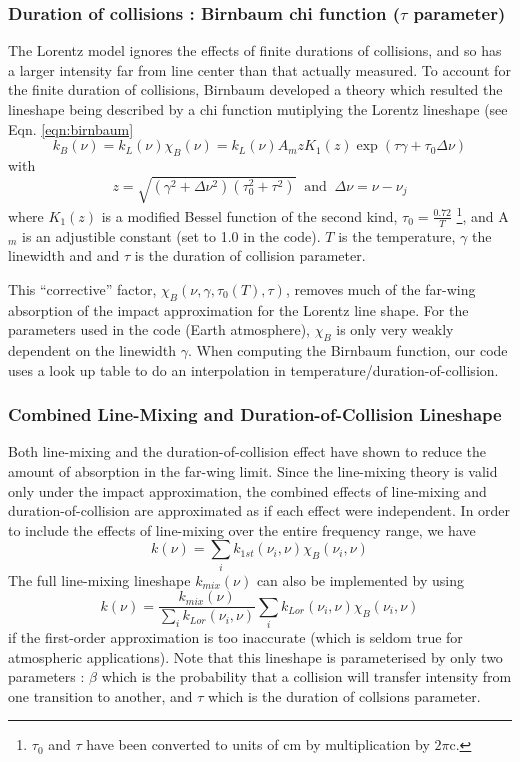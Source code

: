 \documentclass[11pt]{article}
\begin{document}
\subsubsection{Duration of collisions : Birnbaum chi function ($\tau$ 
parameter)}
The Lorentz model ignores the effects of finite durations of collisions, and
so has a larger intensity far from line center than that actually measured. 
To account for the finite duration of collisions, Birnbaum developed a 
theory which resulted the lineshape being described by a chi function 
mutiplying the Lorentz lineshape (see Eqn. \ref{eqn:birnbaum} 
\[
k_{B}(\nu)=k_{L}(\nu)\chi_{B}(\nu)=k_{L}(\nu) A_{m} z K_{1}(z)\exp\left(
\tau\gamma+\tau_{0}\Delta\nu\right)
\]
with
\[
z=\sqrt{(\gamma^{2}+\Delta\nu^{2})(\tau_{0}^{2}+\tau^{2})}
\; \; \mbox{and} \; \;
\Delta\nu=\nu-\nu_{j}
\]
where $K_{1}(z)$ is a modified Bessel function of the second kind, 
$\tau_{0}=\frac{0.72}{T}$ \footnote{$\tau_{0}$ and $\tau$ have been
converted to units of $\mbox{cm}$ by multiplication by $2\pi\mbox{c}$.}, 
and A$_{m}$ is an adjustible constant (set to 1.0 in the code).  $T$ is the 
temperature, $\gamma$ the linewidth and and $\tau$ is the duration of 
collision parameter.

This ``corrective'' factor, $\chi_{B}(\nu,\gamma,\tau_{0}(T),\tau)$, 
removes much of the far-wing absorption of the impact approximation for the 
Lorentz line shape. For the parameters used in the code (Earth atmosphere),
$\chi_{B}$ is only very weakly dependent on the linewidth $\gamma$.  
When computing the Birnbaum function, our code uses a look up table to do 
an interpolation in temperature/duration-of-collision.

\subsubsection{Combined Line-Mixing and Duration-of-Collision Lineshape}
Both line-mixing and the duration-of-collision effect have shown to reduce
the amount of absorption in the far-wing limit.  Since the line-mixing
theory is valid only under the impact approximation, the combined effects
of line-mixing and duration-of-collision are approximated as if each
effect were independent.  In order to include the effects of line-mixing
over the entire frequency range, we have 
\[
k(\nu)=\sum_i k_{1st}(\nu_i,\nu)\chi_{B}(\nu_i,\nu)
\]
The full line-mixing lineshape $k_{mix}(\nu)$ can also be implemented by 
using 
\[
k(\nu)=\frac{k_{mix}(\nu)}{\sum_i k_{Lor}(\nu_i,\nu)}
\sum_i k_{Lor}(\nu_i,\nu)\chi_B(\nu_i,\nu)
\]
if the first-order approximation is too inaccurate (which is seldom true 
for atmospheric applications). Note that this lineshape is parameterised
by only two parameters : $\beta$ which is the probability that a collision
will transfer intensity from one transition to another, and $\tau$ which
is the duration of collsions parameter.
\end{document}
